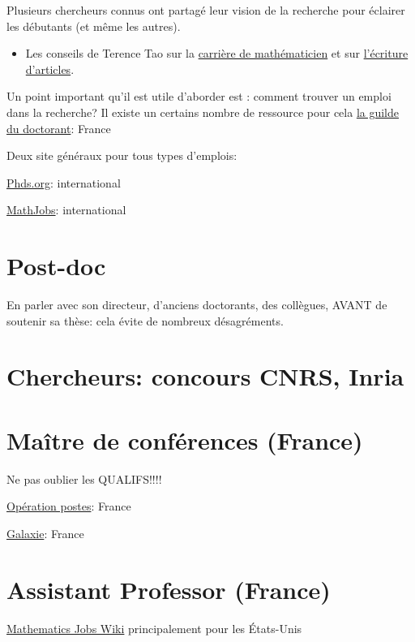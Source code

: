 

Plusieurs chercheurs connus ont partagé leur vision de la recherche
pour éclairer les débutants (et même les autres).
\begin{itemize}
 \item Les conseils de Terence Tao sur la \href{http://terrytao.wordpress.com/career-advice/}{carrière de mathématicien} et sur \href{http://terrytao.wordpress.com/advice-on-writing-papers/}{l'écriture d'articles}.
\end{itemize}


Un point important qu'il est utile d'aborder est : comment trouver un emploi dans la recherche?
Il existe un certains nombre de ressource pour cela
\href{http://guilde.jeunes-chercheurs.org/}{la guilde du doctorant}: France




Deux site généraux pour tous types d'emplois:

\href{http://www.phds.org/}{Phds.org}: international

\href{https://www.mathjobs.org/jobs}{MathJobs}: international


\section{Post-doc}
En parler avec son directeur, d'anciens doctorants, des coll\`egues, AVANT de soutenir sa th\`ese:
cela \'evite de nombreux désagréments.

\section{Chercheurs: concours CNRS, Inria}

\section{Maître de conférences (France)}

Ne pas oublier les QUALIFS!!!!

\href{http://postes.smai.emath.fr/}{Opération postes}: France

\href{https://www.galaxie.enseignementsup-recherche.gouv.fr/ensup/candidats.html}{Galaxie}: France

\section{Assistant Professor (France)}

\href{http://notable.math.ucdavis.edu/wiki/Mathematics_Jobs_Wiki}{Mathematics Jobs Wiki} principalement
pour les \'Etats-Unis

